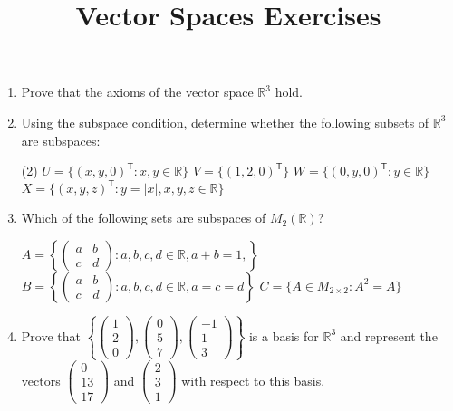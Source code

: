 \documentclass[a4paper,11pt]{article}
\title{Vector Spaces Exercises}
\begin{document}
\maketitle

\begin{enumerate}[label=5.\arabic*]
    \item Prove that the axioms of the vector space $\mathbb{R}^3$ hold.
    
    \item Using the subspace condition, determine whether the following subsets of $\mathbb{R}^3$ are subspaces:
    \begin{tasks}(2)
        \task $U = \{ (x, y, 0)^\mathsf{T} : x, y \in \mathbb{R} \}$
        \task $V = \{ (1, 2, 0)^\mathsf{T} \}$
        \task $W = \{ (0, y, 0)^\mathsf{T} : y \in \mathbb{R} \}$
        \task $X = \{ (x, y, z)^\mathsf{T} : y = |x|, x, y, z \in \mathbb{R}\}$
    \end{tasks}

    \item Which of the following sets are subspaces of $M_2(\mathbb{R})$?
    \begin{tasks}
        \task $A = \left\{ \begin{pmatrix} a & b \\ c & d \end{pmatrix} : a, b, c, d \in \mathbb{R}, a + b = 1,  \right\}$
        \task $B = \left\{ \begin{pmatrix} a & b \\ c & d \end{pmatrix}: a, b, c, d \in \mathbb{R}, a = c = d \right\}$
        \task $C = \{ A \in M_{2\times 2} : A^2 = A \}$
    \end{tasks}

    \item Prove that $\left\{ \begin{pmatrix} 1 \\ 2 \\ 0 \end{pmatrix}, \begin{pmatrix} 0 \\ 5 \\ 7 \end{pmatrix}, \begin{pmatrix} -1 \\ 1 \\ 3 \end{pmatrix} \right\}$ is a basis for $\mathbb{R}^3$ and represent the vectors $\begin{pmatrix} 0 \\ 13 \\ 17 \end{pmatrix}$ and $\begin{pmatrix} 2 \\ 3 \\ 1 \end{pmatrix}$ with respect to this basis.
    

\end{enumerate}
\end{document}
